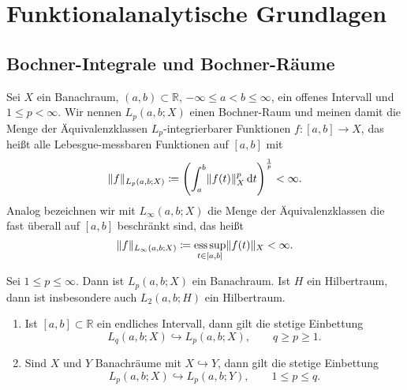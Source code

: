 
\chapter{Funktionalanalytische Grundlagen} %
\label{cha:funktionalanalytische_grundlagen}

\section{Bochner-Integrale und Bochner-Räume} %
\label{sec:bochner_r_ume}

\begin{Definition}
    Sei $X$ ein Banachraum, $(a, b) \subset \mathbb{R}$, $- \infty \leq a < b \leq \infty$, ein offenes Intervall und $1 \leq p < \infty$.
    Wir nennen $L_{p}(a, b; X)$ einen Bochner-Raum und meinen damit die Menge der Äquivalenzklassen $L_{p}$-integrierbarer Funktionen $f \colon [a, b] \to X$, das heißt alle Lebesgue-messbaren Funktionen auf $[a, b]$ mit
    \begin{equation}
        \lVert f\rVert_{L_{p}(a, b; X)} \coloneqq \left( \int_{a}^{b} \lVert f(t)\rVert_{X}^{p} \mathop{}\!\mathrm{d} t \right)^{\frac 1 p} < \infty.
    \end{equation}
    Analog bezeichnen wir mit $L_{\infty}(a, b; X)$ die Menge der Äquivalenzklassen die fast überall auf $[a, b]$ beschränkt sind, das heißt
    \begin{equation}
        \lVert f\rVert_{L_{\infty}(a, b; X)} \coloneqq \operatorname*{ess\,sup}_{t \in [a, b]} \lVert f(t)\rVert_{X} < \infty.
    \end{equation}
\end{Definition}

\begin{Lemma}
    Sei $1 \leq p \leq \infty$. Dann ist $L_{p}(a, b; X)$ ein Banachraum.
    Ist $H$ ein Hilbertraum, dann ist insbesondere auch $L_{2}(a, b; H)$ ein Hilbertraum.
\end{Lemma}

\begin{Lemma}[Eigenschaften]
    \begin{enumerate}
        \item Ist $[a, b] \subset \mathbb{R}$ ein endliches Intervall, dann gilt die stetige Einbettung
        \begin{equation}
            L_{q}(a, b; X) \hookrightarrow L_{p}(a, b; X), \qquad q \geq p \geq 1.
        \end{equation}
        \item Sind $X$ und $Y$ Banachräume mit $X \hookrightarrow Y$, dann gilt die stetige Einbettung
        \begin{equation}
            L_{p}(a, b; X) \hookrightarrow L_{p}(a, b; Y), \qquad 1 \leq p \leq q.
        \end{equation}
    \end{enumerate}
\end{Lemma}

